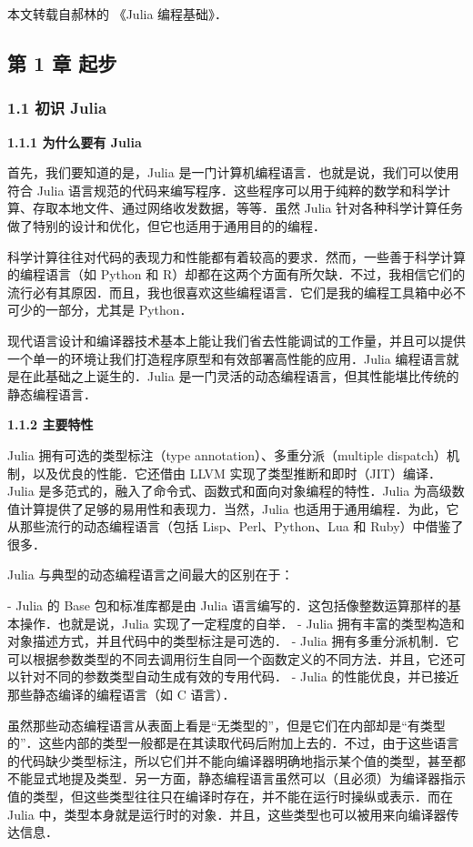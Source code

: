 
本文转载自郝林的 《Julia 编程基础》．

\subsection{第 1 章 起步}

\subsubsection{1.1 初识 Julia}

\textbf{1.1.1 为什么要有 Julia}

首先，我们要知道的是，Julia 是一门计算机编程语言．也就是说，我们可以使用符合 Julia 语言规范的代码来编写程序．这些程序可以用于纯粹的数学和科学计算、存取本地文件、通过网络收发数据，等等．虽然 Julia 针对各种科学计算任务做了特别的设计和优化，但它也适用于通用目的的编程．

科学计算往往对代码的表现力和性能都有着较高的要求．然而，一些善于科学计算的编程语言（如 Python 和 R）却都在这两个方面有所欠缺．不过，我相信它们的流行必有其原因．而且，我也很喜欢这些编程语言．它们是我的编程工具箱中必不可少的一部分，尤其是 Python．

现代语言设计和编译器技术基本上能让我们省去性能调试的工作量，并且可以提供一个单一的环境让我们打造程序原型和有效部署高性能的应用．Julia 编程语言就是在此基础之上诞生的．Julia 是一门灵活的动态编程语言，但其性能堪比传统的静态编程语言．

\textbf{1.1.2 主要特性}

Julia 拥有可选的类型标注（type annotation）、多重分派（multiple dispatch）机制，以及优良的性能．它还借由 LLVM 实现了类型推断和即时（JIT）编译．Julia 是多范式的，融入了命令式、函数式和面向对象编程的特性．Julia 为高级数值计算提供了足够的易用性和表现力．当然，Julia 也适用于通用编程．为此，它从那些流行的动态编程语言（包括 Lisp、Perl、Python、Lua 和 Ruby）中借鉴了很多．

Julia 与典型的动态编程语言之间最大的区别在于：

- Julia 的 Base 包和标准库都是由 Julia 语言编写的．这包括像整数运算那样的基本操作．也就是说，Julia 实现了一定程度的自举．
- Julia 拥有丰富的类型构造和对象描述方式，并且代码中的类型标注是可选的．
- Julia 拥有多重分派机制．它可以根据参数类型的不同去调用衍生自同一个函数定义的不同方法．并且，它还可以针对不同的参数类型自动生成有效的专用代码．
- Julia 的性能优良，并已接近那些静态编译的编程语言（如 C 语言）．

虽然那些动态编程语言从表面上看是“无类型的”，但是它们在内部却是“有类型的”．这些内部的类型一般都是在其读取代码后附加上去的．不过，由于这些语言的代码缺少类型标注，所以它们并不能向编译器明确地指示某个值的类型，甚至都不能显式地提及类型．另一方面，静态编程语言虽然可以（且必须）为编译器指示值的类型，但这些类型往往只在编译时存在，并不能在运行时操纵或表示．而在 Julia 中，类型本身就是运行时的对象．并且，这些类型也可以被用来向编译器传达信息．

